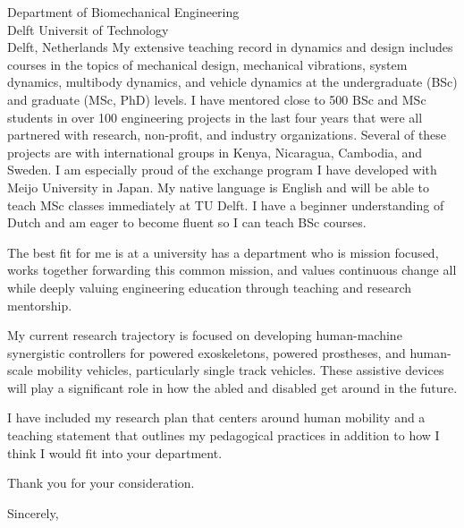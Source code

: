 \documentclass{letter}
\begin{document}
\begin{letter}{
  Department of Biomechanical Engineering \\
  Delft Universit of Technology \\
  Delft, Netherlands
}
My extensive teaching record in dynamics and design includes
courses in the topics of mechanical design, mechanical vibrations, system
dynamics, multibody dynamics, and vehicle dynamics at the undergraduate (BSc)
and graduate (MSc, PhD) levels. I have mentored close to 500 BSc and MSc
students in over 100 engineering projects in the last four years that were all
partnered with research, non-profit, and industry organizations. Several of
these projects are with international groups in Kenya, Nicaragua, Cambodia, and
Sweden. I am especially proud of the exchange program I have developed with
Meijo University in Japan. My native language is English and will be able to
teach MSc classes immediately at TU Delft. I have a beginner understanding of
Dutch and am eager to become fluent so I can teach BSc courses.

The best fit for me is at a university has a department who is mission focused,
works together forwarding this common mission, and values continuous change all
while deeply valuing engineering education through teaching and research
mentorship.

My current research trajectory is focused on developing human-machine
synergistic controllers for powered exoskeletons, powered prostheses, and
human-scale mobility vehicles, particularly single track vehicles. These
assistive devices will play a significant role in how the abled and disabled
get around in the future.

I have included my research plan that centers around human mobility and a
teaching statement that outlines my pedagogical practices in addition to how I
think I would fit into your department.

Thank you for your consideration.


\closing{Sincerely,}

\end{letter}
\end{document}
